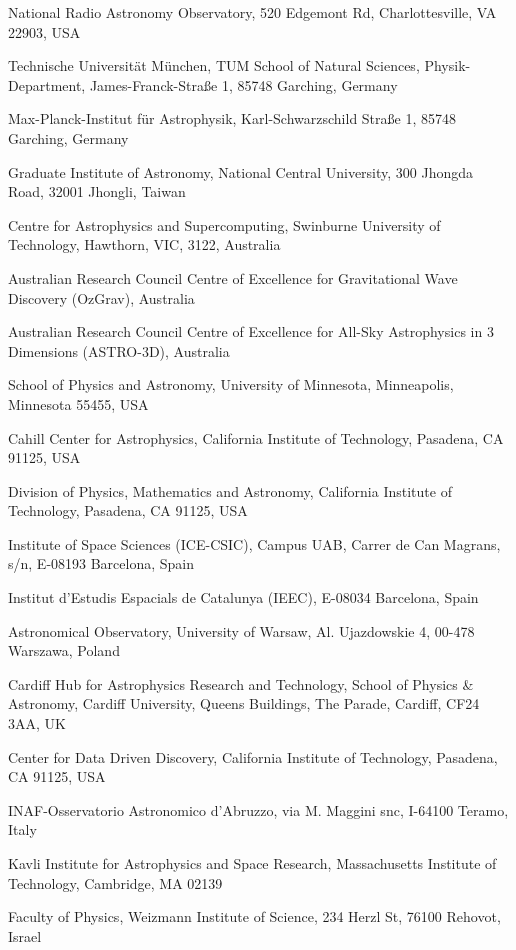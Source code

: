 \documentclass{nature_plusfigure}
\begin{document}
\begin{small}
\begin{affiliations}
\item National Radio Astronomy Observatory, 520 Edgemont Rd, Charlottesville, VA 22903, USA
\item Technische Universit{\"a}t M{\"u}nchen, TUM School of Natural Sciences, Physik-Department, James-Franck-Stra{\ss}e 1, 85748 Garching, Germany
\item Max-Planck-Institut f{\"u}r Astrophysik, Karl-Schwarzschild Stra{\ss}e 1, 85748 Garching, Germany
\item Graduate Institute of Astronomy, National Central University, 300 Jhongda Road, 32001 Jhongli, Taiwan
\item Centre for Astrophysics and Supercomputing, Swinburne University of Technology, Hawthorn, VIC, 3122, Australia
\item Australian Research Council Centre of Excellence for Gravitational Wave Discovery (OzGrav), Australia
\item Australian Research Council Centre of Excellence for All-Sky Astrophysics in 3 Dimensions (ASTRO-3D), Australia
\item School of Physics and Astronomy, University of Minnesota, Minneapolis, Minnesota 55455, USA
\item Cahill Center for Astrophysics, California Institute of Technology, Pasadena, CA 91125, USA
\item Division of Physics, Mathematics and Astronomy, California Institute of Technology, Pasadena, CA 91125, USA
\item Institute of Space Sciences (ICE-CSIC), Campus UAB, Carrer de Can Magrans, s/n, E-08193 Barcelona, Spain
\item Institut d'Estudis Espacials de Catalunya (IEEC), E-08034 Barcelona, Spain
\item Astronomical Observatory, University of Warsaw, Al. Ujazdowskie 4, 00-478 Warszawa, Poland
\item Cardiff Hub for Astrophysics Research and Technology, School of Physics \& Astronomy, Cardiff University, Queens Buildings, The Parade, Cardiff, CF24 3AA, UK
\item Center for Data Driven Discovery, California Institute of Technology, Pasadena, CA 91125, USA
\item INAF-Osservatorio Astronomico d’Abruzzo, via M. Maggini snc, I-64100 Teramo, Italy
\item Kavli Institute for Astrophysics and Space Research, Massachusetts Institute of Technology, Cambridge, MA 02139
\item Faculty of Physics, Weizmann Institute of Science, 234 Herzl St, 76100 Rehovot, Israel

\end{affiliations}
\end{small}
\end{document}
